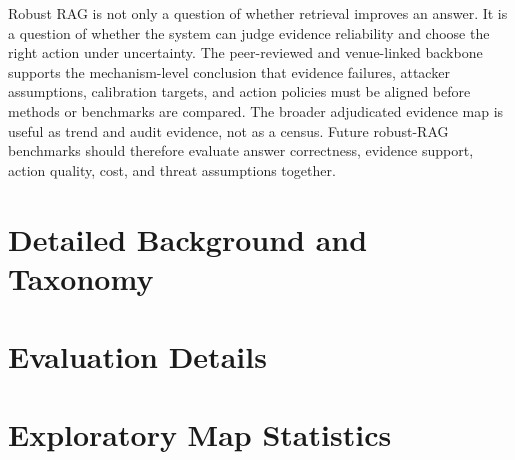 \documentclass[11pt]{article}
\begin{document}
Robust RAG is not only a question of whether retrieval improves an answer. It is a question of whether the system can judge evidence reliability and choose the right action under uncertainty. The peer-reviewed and venue-linked backbone supports the mechanism-level conclusion that evidence failures, attacker assumptions, calibration targets, and action policies must be aligned before methods or benchmarks are compared. The broader adjudicated evidence map is useful as trend and audit evidence, not as a census. Future robust-RAG benchmarks should therefore evaluate answer correctness, evidence support, action quality, cost, and threat assumptions together.

\clearpage


\appendix


\section{Detailed Background and Taxonomy}












\section{Evaluation Details}
\label{sec:appendix-eval}













\section{Exploratory Map Statistics}
\label{sec:map-statistics}




\end{document}
